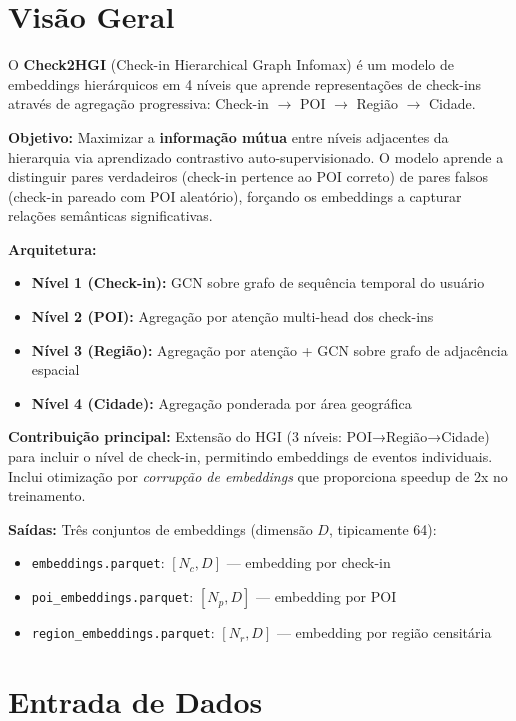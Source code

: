 \documentclass[a4paper,11pt]{article}
\begin{document}
\vspace{-0.3em}

\section{Visão Geral}

O \textbf{Check2HGI} (Check-in Hierarchical Graph Infomax) é um modelo de embeddings hierárquicos em 4 níveis que aprende representações de check-ins através de agregação progressiva: Check-in $\rightarrow$ POI $\rightarrow$ Região $\rightarrow$ Cidade.

\textbf{Objetivo:} Maximizar a \textbf{informação mútua} entre níveis adjacentes da hierarquia via aprendizado contrastivo auto-supervisionado. O modelo aprende a distinguir pares verdadeiros (check-in pertence ao POI correto) de pares falsos (check-in pareado com POI aleatório), forçando os embeddings a capturar relações semânticas significativas.

\textbf{Arquitetura:}
\begin{itemize}
    \item \textbf{Nível 1 (Check-in):} GCN sobre grafo de sequência temporal do usuário
    \item \textbf{Nível 2 (POI):} Agregação por atenção multi-head dos check-ins
    \item \textbf{Nível 3 (Região):} Agregação por atenção + GCN sobre grafo de adjacência espacial
    \item \textbf{Nível 4 (Cidade):} Agregação ponderada por área geográfica
\end{itemize}

\textbf{Contribuição principal:} Extensão do HGI (3 níveis: POI→Região→Cidade) para incluir o nível de check-in, permitindo embeddings de eventos individuais. Inclui otimização por \textit{corrupção de embeddings} que proporciona speedup de 2x no treinamento.

\textbf{Saídas:} Três conjuntos de embeddings (dimensão $D$, tipicamente 64):
\begin{itemize}
    \item \texttt{embeddings.parquet}: $[N_c, D]$ --- embedding por check-in
    \item \texttt{poi\_embeddings.parquet}: $[N_p, D]$ --- embedding por POI
    \item \texttt{region\_embeddings.parquet}: $[N_r, D]$ --- embedding por região censitária
\end{itemize}

\section{Entrada de Dados}
\end{document}
